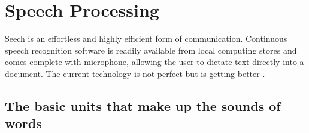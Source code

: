 \chapter{Speech Processing}\label{ch:speech_processing}

Seech is an effortless and highly efficient form of communication. Continuous speech recognition software is readily available from local computing stores and comes complete with microphone, allowing the user to dictate text directly into a document. The current technology is not perfect but is getting better \cite[p.~396]{callan2003artificial}.

\section{The basic units that make up the sounds of words}
